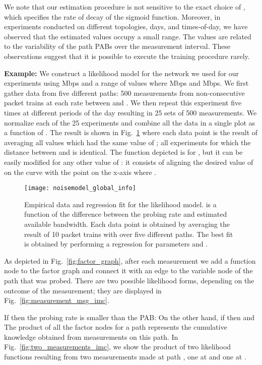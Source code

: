 \documentclass[final,5p,times,twocolumn]{elsarticle}
\begin{document}
We note that our estimation procedure is not sensitive to the exact choice of , which specifies the rate of decay of the sigmoid function. Moreover, in experiments conducted on different topologies, days, and times-of-day, we have observed that the estimated  values occupy a small range. The values are related to the variability of the path PABs over the measurement interval. These observations suggest that it is possible to execute the training procedure rarely.

{\bf Example:} We construct a likelihood model for the network we used for our experiments using  Mbps and a range of values where  Mbps and  Mbps.  We first gather data from five different paths: 500 measurements from non-consecutive packet trains at each rate between  and .  We then repeat this experiment five times at different periods of the day resulting in 25 sets of 500 measurements.  We normalize each of the 25 experiments and combine all the data in a single plot as a function of . The result is shown in Fig.~\ref{fig:likelihood_info} where each data point is the result of averaging all values which had the same value of ; all experiments for which the distance between  and  is identical.  The function depicted is for , but it can be easily modified for any other value of : it consists of aligning the desired value of  on the curve with the point on the x-axis where .


\begin{figure}[!h]
	\centering
	\texttt{[image: noisemodel\_global\_info]}
	\caption{Empirical data and regression fit for the likelihood model.   is a function of the difference between the probing rate and estimated available bandwidth.  Each data point is obtained by averaging the result of 10 packet trains with  over five different paths.  The best fit is obtained by performing a regression for parameters  and .\label{fig:likelihood_info}}
\end{figure}

As depicted in Fig.~\ref{fig:factor_graph}, after each measurement we add a function node  to the factor graph and connect it with an edge to the variable node  of the path that was probed.  There are two possible likelihood forms, depending on the outcome of the measurement; they are displayed in Fig.~\ref{fig:measurement_msg_imc}.  

If  then the probing rate is smaller than the PAB:   On the other hand, if  then  and   The product of all the  factor nodes for a path represents the cumulative knowledge obtained from measurements on this path.  In Fig.~\ref{fig:two_measurements_imc}, we show the product of two likelihood functions resulting from two measurements made at path , one at  and one at .  
\end{document}
